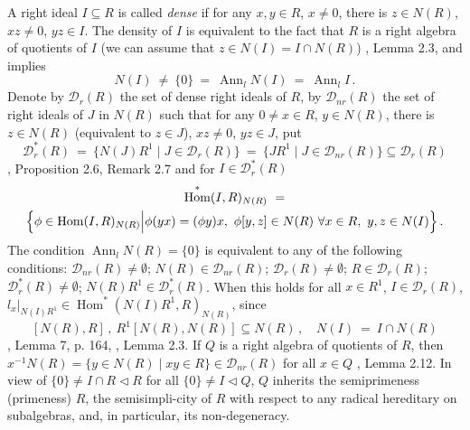 \documentclass[a4paper,11pt]{article}
\DeclareMathOperator{\Hom}{Hom}
\DeclareMathOperator{\Ann}{Ann}
\begin{document}
A right ideal ${I\subseteq R}$ is called \emph{dense} if for any 
${x, y\in R}$, ${x\ne 0}$, there is ${z\in N(R)}$, ${x z\ne 0}$, 
${y z\in I}$. The density of $I$ is equivalent to the fact that $R$ is a 
right algebra of quotients of $I$ (we can assume that ${z\in N(I)=I\cap N(R)}$) 
\cite{MLQA}, Lemma 2.3, and implies 
\[
N(I)\ \ne\  \{0\}\ =\ \Ann_l N(I)\ =\ \Ann_l I\,. 
\]
Denote by $\mathcal{D}_r(R)$ the set of dense right ideals of $R$, by 
$\mathcal{D}_{nr}(R)$ the set of right ideals of $J$ in $N(R)$ such that for 
any ${0\ne x\in R}$, ${y\in N(R)}$, there is ${z\in N(R)}$ 
(equivalent to ${z\in J}$), ${x z\ne 0}$, ${y z\in J}$, put  
\[
\mathcal{D}_r^*(R)\ =\ \{N(J) R^1\mid J\in \mathcal{D}_r(R)\}\ =\ 
\{J R^1\mid J\in \mathcal{D}_{nr}(R)\}\subseteq \mathcal{D}_r(R)
\]
\cite{MLQA}, Proposition 2.6, Remark 2.7 and for 
${I\in \mathcal{D}_r^*(R)}$ 
\begin{multline*} 
\Hom^*(I, R)_{N(R)}\ =
\\ 
\Bigl\{\phi\in \Hom(I, R)_{N(R)}\Bigl| 
\phi(y x)=(\phi y) x,\ \phi[y, z]\in N(R)\ \forall x\in R,\ 
y, z\in N(I)\Bigr\}\,.
\end{multline*}
The condition ${\Ann_l N(R)=\{0\}}$ is equivalent to any of the following 
conditions: ${\mathcal{D}_{nr}(R)\ne \emptyset}$; 
${N(R)\in \mathcal{D}_{nr}(R)}$; ${\mathcal{D}_r(R)\ne \emptyset}$; 
${R\in \mathcal{D}_r(R)}$; ${\mathcal{D}_r^*(R)\ne \emptyset}$; 
${N(R) R^1\in \mathcal{D}_r^*(R)}$. 
When this holds for all ${x\in R^1}$, ${I\in \mathcal{D}_r(R)}$,
${l_x|_{N(I) R^1}\in \Hom^*(N(I) R^1, R)_{N(R)}}$, since 
\[
[N(R), R]\,,\ R^1 [N(R), N(R)]\subseteq N(R)\,,\quad 
N(I)\ =\ I\cap N(R)
\] 
\cite{ZShS}, Lemma 7, p. 164, \cite{MLQA}, Lemma 2.3. If $Q$ is a 
right algebra of quotients of $R$, then 
${x^{-1} N(R)=\{y\in N(R)\mid x y\in R\}\in \mathcal{D}_{nr}(R)}$ for all 
${x\in Q}$ \cite{MLQA}, Lemma 2.12. In view of 
$\{0\}\ne I\cap R\lhd R$ for all ${\{0\}\ne I\lhd Q}$, $Q$ inherits the 
semiprimeness (primeness) $R$, the semisimpli-\linebreak city of $R$ with respect to 
any radical hereditary on subalgebras, and, in particular, its 
non-degeneracy. 
\end{document}
